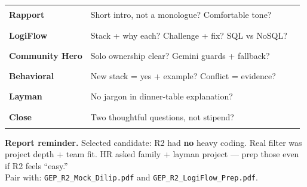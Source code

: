 \documentclass[11pt,a4paper]{article}
\newcommand{\card}[1]{%
  \par\vspace{4pt}%
  \noindent\colorbox{soft}{%
    \parbox{\dimexpr\textwidth-2\fboxsep}{\vspace{5pt}#1\vspace{5pt}}%
  }\par\vspace{5pt}%
}
\begin{document}
\begin{tabular}{@{}p{3.2cm}p{9cm}c@{}}
\textbf{Rapport} & Short intro, not a monologue? Comfortable tone? & \rule{1.4cm}{0.4pt} \\
\textbf{LogiFlow} & Stack + why each? Challenge + fix? SQL vs NoSQL? & \rule{1.4cm}{0.4pt} \\
\textbf{Community Hero} & Solo ownership clear? Gemini guards + fallback? & \rule{1.4cm}{0.4pt} \\
\textbf{Behavioral} & New stack = yes + example? Conflict = evidence? & \rule{1.4cm}{0.4pt} \\
\textbf{Layman} & No jargon in dinner-table explanation? & \rule{1.4cm}{0.4pt} \\
\textbf{Close} & Two thoughtful questions, not stipend? & \rule{1.4cm}{0.4pt} \\
\end{tabular}

\vspace{8pt}
\card{\textbf{Report reminder.} Selected candidate: R2 had \textbf{no} heavy coding. Real filter was project depth + team fit. HR asked family + layman project --- prep those even if R2 feels ``easy.''\\[4pt]
Pair with: \texttt{GEP\_R2\_Mock\_Dilip.pdf} and \texttt{GEP\_R2\_LogiFlow\_Prep.pdf}.}
\end{document}
